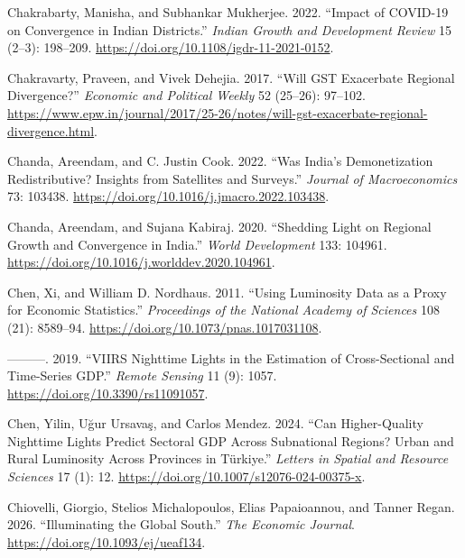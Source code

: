 \documentclass[
  letterpaper,
  DIV=11,
  numbers=noendperiod]{scrartcl}
\newlength{\cslhangindent}
\newenvironment{CSLReferences}[2] %
 {\begin{list}{}{%
  \setlength{\itemindent}{0pt}
  \setlength{\leftmargin}{0pt}
  \setlength{\parsep}{0pt}
  \ifodd #1
   \setlength{\leftmargin}{\cslhangindent}
   \setlength{\itemindent}{-1\cslhangindent}
  \fi
  \setlength{\itemsep}{#2\baselineskip}}}
 {\end{list}}
\begin{document}
\begin{CSLReferences}{1}{0}
Chakrabarty, Manisha, and Subhankar Mukherjee. 2022. {``Impact of
{COVID}-19 on Convergence in {Indian} Districts.''} \emph{Indian Growth
and Development Review} 15 (2--3): 198--209.
\url{https://doi.org/10.1108/igdr-11-2021-0152}.

Chakravarty, Praveen, and Vivek Dehejia. 2017. {``Will {GST} Exacerbate
Regional Divergence?''} \emph{Economic and Political Weekly} 52
(25--26): 97--102.
\url{https://www.epw.in/journal/2017/25-26/notes/will-gst-exacerbate-regional-divergence.html}.

Chanda, Areendam, and C. Justin Cook. 2022. {``Was {India's}
Demonetization Redistributive? {Insights} from Satellites and
Surveys.''} \emph{Journal of Macroeconomics} 73: 103438.
\url{https://doi.org/10.1016/j.jmacro.2022.103438}.

Chanda, Areendam, and Sujana Kabiraj. 2020. {``Shedding Light on
Regional Growth and Convergence in {India}.''} \emph{World Development}
133: 104961. \url{https://doi.org/10.1016/j.worlddev.2020.104961}.

Chen, Xi, and William D. Nordhaus. 2011. {``Using Luminosity Data as a
Proxy for Economic Statistics.''} \emph{Proceedings of the National
Academy of Sciences} 108 (21): 8589--94.
\url{https://doi.org/10.1073/pnas.1017031108}.

---------. 2019. {``{VIIRS} Nighttime Lights in the Estimation of
Cross-Sectional and Time-Series {GDP}.''} \emph{Remote Sensing} 11 (9):
1057. \url{https://doi.org/10.3390/rs11091057}.

Chen, Yilin, Uğur Ursavaş, and Carlos Mendez. 2024. {``Can
Higher-Quality Nighttime Lights Predict Sectoral {GDP} Across
Subnational Regions? {Urban} and Rural Luminosity Across Provinces in
{Türkiye}.''} \emph{Letters in Spatial and Resource Sciences} 17 (1):
12. \url{https://doi.org/10.1007/s12076-024-00375-x}.

Chiovelli, Giorgio, Stelios Michalopoulos, Elias Papaioannou, and Tanner
Regan. 2026. {``Illuminating the {Global South}.''} \emph{The Economic
Journal}. \url{https://doi.org/10.1093/ej/ueaf134}.


\end{CSLReferences}
\end{document}
